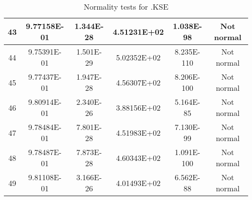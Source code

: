 \begin{table}[h]
\begin{tabular}{|c|c|c|c|c|c|}
		43 & 9.77158E-01 & 1.344E-28 & 4.51231E+02 & 1.038E-98 & Not normal\\\hline
		44 & 9.75391E-01 & 1.501E-29 & 5.02352E+02 & 8.235E-110 & Not normal\\\hline
		45 & 9.77437E-01 & 1.947E-28 & 4.56307E+02 & 8.206E-100 & Not normal\\\hline
		46 & 9.80914E-01 & 2.340E-26 & 3.88156E+02 & 5.164E-85 & Not normal\\\hline
		47 & 9.78484E-01 & 7.801E-28 & 4.51983E+02 & 7.130E-99 & Not normal\\\hline
		48 & 9.78487E-01 & 7.873E-28 & 4.60343E+02 & 1.091E-100 & Not normal\\\hline
		49 & 9.81108E-01 & 3.166E-26 & 4.01493E+02 & 6.562E-88 & Not normal\\\hline
	\end{tabular}
	\caption{Normality tests for .KSE}
	\label{tab:normality_tests_KSE}
\end{table}
